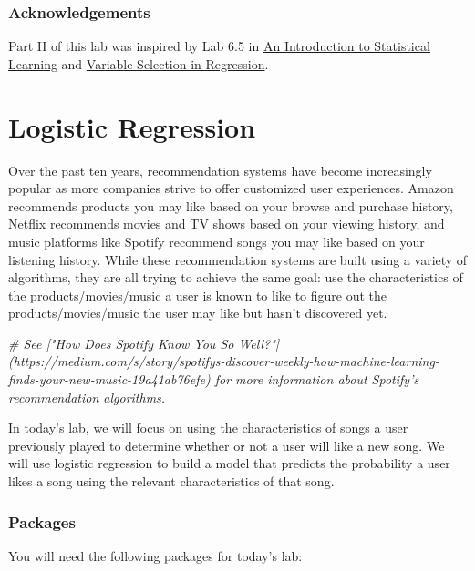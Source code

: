 \documentclass[]{book}
\newenvironment{Shaded}{\begin{snugshade}}{\end{snugshade}}
\newcommand{\CommentTok}[1]{\textcolor[rgb]{0.56,0.35,0.01}{\textit{#1}}}
\begin{document}
\subsection{Acknowledgements}\label{acknowledgements}

Part II of this lab was inspired by Lab 6.5 in
\href{http://www-bcf.usc.edu/~gareth/ISL/}{An Introduction to
Statistical Learning} and
\href{https://www.andrew.cmu.edu/user/achoulde/95791/homework/homework3.html}{Variable
Selection in Regression}.

\chapter{Logistic Regression}\label{logistic}

Over the past ten years, recommendation systems have become increasingly
popular as more companies strive to offer customized user experiences.
Amazon recommends products you may like based on your browse and
purchase history, Netflix recommends movies and TV shows based on your
viewing history, and music platforms like Spotify recommend songs you
may like based on your listening history. While these recommendation
systems are built using a variety of algorithms, they are all trying to
achieve the same goal: use the characteristics of the
products/movies/music a user is known to like to figure out the
products/movies/music the user may like but hasn't discovered yet.

\begin{Shaded}
\begin{Highlighting}[]
\CommentTok{# See ["How Does Spotify Know You So Well?"](https://medium.com/s/story/spotifys-discover-weekly-how-machine-learning-finds-your-new-music-19a41ab76efe) for more information about Spotify's recommendation algorithms.}
\end{Highlighting}
\end{Shaded}

In today's lab, we will focus on using the characteristics of songs a
user previously played to determine whether or not a user will like a
new song. We will use logistic regression to build a model that predicts
the probability a user likes a song using the relevant characteristics
of that song.

\subsection{Packages}\label{packages-6}

You will need the following packages for today's lab:
\end{document}
